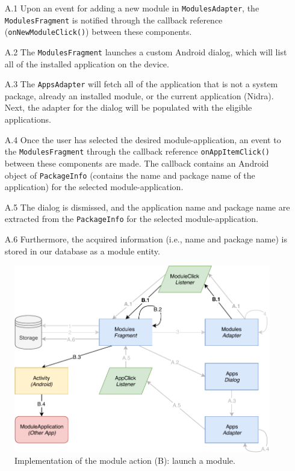 \begin{itemize}
    \item[A.1] Upon an event for adding a new module in \verb|ModulesAdapter|, the \verb|ModulesFragment| is notified through the callback reference (\verb|onNewModuleClick()|) between these components.
    \item[A.2] The \verb|ModulesFragment| launches a custom Android dialog, which will list all of the installed application on the device. 
    \item[A.3] The \verb|AppsAdapter| will fetch all of the application that is not a system package, already an installed module, or the current application (Nidra). Next, the adapter for the dialog will be populated with the eligible applications. 
    \item[A.4] Once the user has selected the desired module-application, an event to the \verb|ModulesFragment| through the callback reference \verb|onAppItemClick()| between these components are made. The callback contains an Android object of \verb|PackageInfo| (contains the name and package name of the application) for the selected module-application.
    \item[A.5] The dialog is dismissed, and the application name and package name are extracted from the \verb|PackageInfo| for the selected module-application. 
    \item[A.6] Furthermore, the acquired information (i.e., name and package name) is stored in our database as a module entity. 
\end{itemize}

\begin{figure}[!h]
    \centering
    \includegraphics[scale=0.7]{images/Module_ImpB.pdf}
    \caption{Implementation of the module action (B): launch a module.}
    \label{fig:impl_modulesB}
\end{figure}

